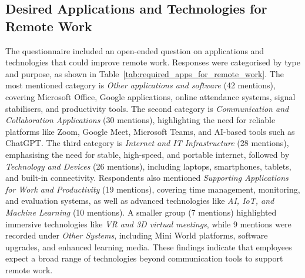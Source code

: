\documentclass{infotel}
\begin{document}
\subsection{Desired Applications and Technologies for Remote Work}
\label{sec:desired-apps}

The questionnaire included an open-ended question on applications and technologies that could improve remote work. Responses were categorised by type and purpose, as shown in Table~\ref{tab:required_apps_for_remote_work}. The most mentioned category is \textit{Other applications and software} (42 mentions), covering Microsoft Office, Google applications, online attendance systems, signal stabilisers, and productivity tools. The second category is \textit{Communication and Collaboration Applications} (30 mentions), highlighting the need for reliable platforms like Zoom, Google Meet, Microsoft Teams, and AI-based tools such as ChatGPT. The third category is \textit{Internet and IT Infrastructure} (28 mentions), emphasising the need for stable, high-speed, and portable internet, followed by \textit{Technology and Devices} (26 mentions), including laptops, smartphones, tablets, and built-in connectivity. Respondents also mentioned \textit{Supporting Applications for Work and Productivity} (19 mentions), covering time management, monitoring, and evaluation systems, as well as advanced technologies like \textit{AI, IoT, and Machine Learning} (10 mentions). A smaller group (7 mentions) highlighted immersive technologies like \textit{VR and 3D virtual meetings}, while 9 mentions were recorded under \textit{Other Systems}, including Mini World platforms, software upgrades, and enhanced learning media. These findings indicate that employees expect a broad range of technologies beyond communication tools to support remote work.
\end{document}
